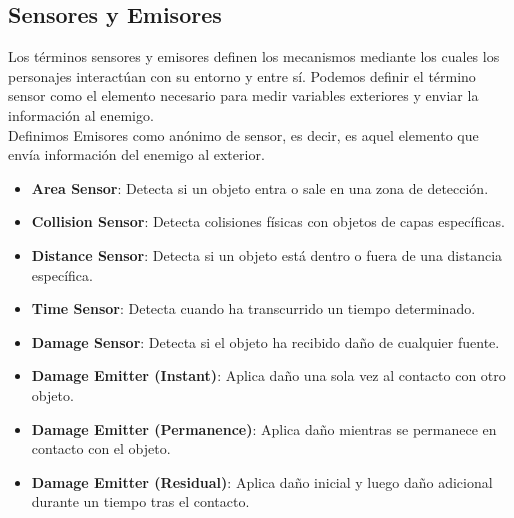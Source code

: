 \subsection{Sensores y Emisores}
\label{subsec:sensores y emisores}
Los términos sensores y emisores definen los mecanismos mediante los cuales los personajes interactúan con su entorno y entre sí.
Podemos definir el término sensor como el elemento necesario para medir variables exteriores y enviar la información al enemigo.\\
Definimos Emisores como anónimo de sensor, es decir, es aquel elemento que envía información del enemigo al exterior.
\begin{itemize}
    \item \textbf{Area Sensor}: Detecta si un objeto entra o sale en una zona de detección.
    \item \textbf{Collision Sensor}: Detecta colisiones físicas con objetos de capas específicas.
    \item \textbf{Distance Sensor}: Detecta si un objeto está dentro o fuera de una distancia específica.
    \item \textbf{Time Sensor}: Detecta cuando ha transcurrido un tiempo determinado.
    \item \textbf{Damage Sensor}: Detecta si el objeto ha recibido daño de cualquier fuente.
    \item \textbf{Damage Emitter (Instant)}: Aplica daño una sola vez al contacto con otro objeto.
    \item \textbf{Damage Emitter (Permanence)}: Aplica daño mientras se permanece en contacto con el objeto.
    \item \textbf{Damage Emitter (Residual)}: Aplica daño inicial y luego daño adicional durante un tiempo tras el contacto.
\end{itemize}
